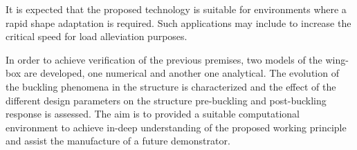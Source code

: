   It is expected that the proposed technology is suitable for environments where a rapid shape adaptation is required. Such applications may include to increase the critical speed for load alleviation purposes.

  In order to achieve verification of the previous premises, two models of the wing-box are developed, one numerical and another one analytical. The evolution of the buckling phenomena in the structure is characterized and the effect of the different design parameters on the structure pre-buckling and post-buckling response is assessed. The aim is to provided a suitable computational environment to achieve in-deep understanding of the proposed working principle and assist the manufacture of a future demonstrator.
